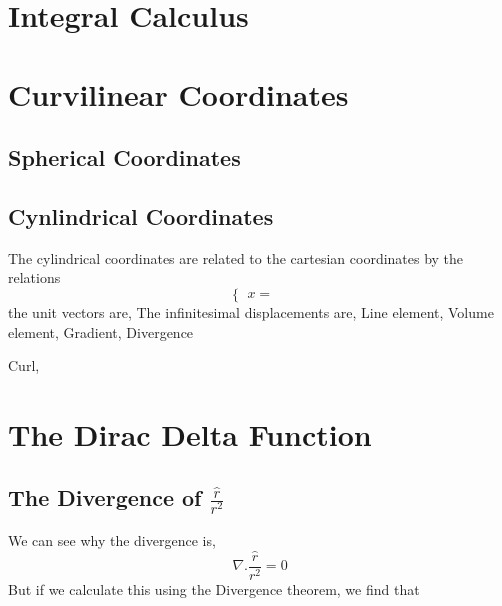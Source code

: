 \documentclass[]{article}
\begin{document}
\section{Integral Calculus}

\section{Curvilinear Coordinates}
\subsection{Spherical Coordinates}
\subsection{Cynlindrical Coordinates}
The cylindrical coordinates are related to the cartesian coordinates by the relations
\begin{equation}
	\begin{cases}
		x = &
		
	\end{cases}
\end{equation}
the unit vectors are,
The infinitesimal displacements are,
Line element,
Volume element,
Gradient,
Divergence

Curl,

\section{The Dirac Delta Function}
\subsection{The Divergence of $\frac{\hat{r}}{r^{2}}$}
We can see why the divergence is,
\begin{equation}
	\nabla . \frac{\hat{r}}{r^{2}} = 0
\end{equation}
But if we calculate this using the Divergence theorem, we find that 
\end{document}
